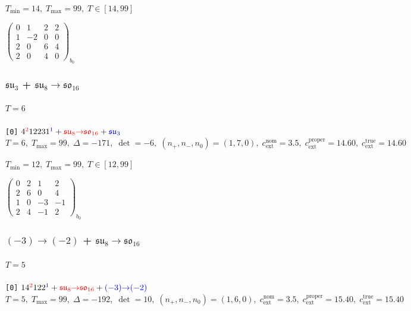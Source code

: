\documentclass[10pt]{article}
\begin{document}
\hspace{1em}$T_{\min}=14,\;T_{\max}=99,\;T\in[14,99]$

\hspace{2em}$\left(\begin{smallmatrix}0 & 1 & 2 & 2 \\ 1 & -2 & 0 & 0 \\ 2 & 0 & 6 & 4 \\ 2 & 0 & 4 & 0\end{smallmatrix}\right)_{\!b_0}$


\subsubsection*{$\mathfrak{su}_3$ + $\mathfrak{su}_8{\to}\mathfrak{so}_{16}$}

\paragraph{$T=6$}

\texttt{[0]} $4^{\textcolor{red}{2}}12231^{\textcolor{blue}{1}} + \textcolor{red}{\mathfrak{su}_8{\to}\mathfrak{so}_{16}} + \textcolor{blue}{\mathfrak{su}_3}$ \quad $T=6,\;T_{\max}=99,\;\Delta=-171,\;\det=-6,\;(n_+,n_-,n_0)=(1,7,0),\;c_\mathrm{ext}^{\mathrm{nom}}=3.5,\;c_\mathrm{ext}^{\mathrm{proper}}=14.60,\;c_\mathrm{ext}^{\mathrm{true}}=14.60$

\hspace{1em}$T_{\min}=12,\;T_{\max}=99,\;T\in[12,99]$

\hspace{2em}$\left(\begin{smallmatrix}0 & 2 & 1 & 2 \\ 2 & 6 & 0 & 4 \\ 1 & 0 & -3 & -1 \\ 2 & 4 & -1 & 2\end{smallmatrix}\right)_{\!b_0}$


\subsubsection*{$(-3){\to}(-2)$ + $\mathfrak{su}_8{\to}\mathfrak{so}_{16}$}

\paragraph{$T=5$}

\texttt{[0]} $14^{\textcolor{red}{2}}122^{\textcolor{blue}{1}} + \textcolor{red}{\mathfrak{su}_8{\to}\mathfrak{so}_{16}} + \textcolor{blue}{(-3){\to}(-2)}$ \quad $T=5,\;T_{\max}=99,\;\Delta=-192,\;\det=10,\;(n_+,n_-,n_0)=(1,6,0),\;c_\mathrm{ext}^{\mathrm{nom}}=3.5,\;c_\mathrm{ext}^{\mathrm{proper}}=15.40,\;c_\mathrm{ext}^{\mathrm{true}}=15.40$
\end{document}

